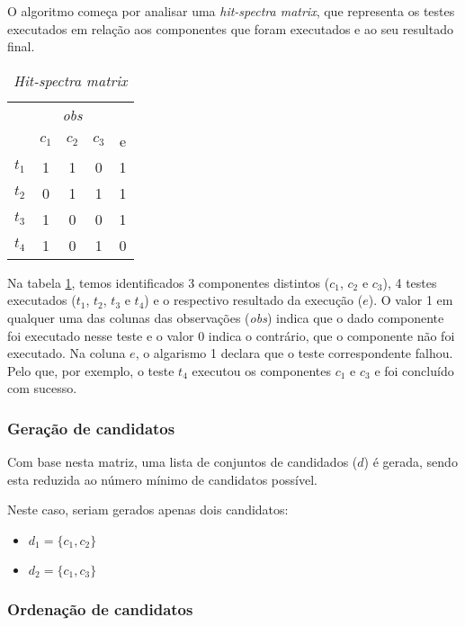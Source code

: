 O algoritmo começa por analisar uma \emph{hit-spectra matrix}, que representa os testes executados em relação aos componentes que foram executados e ao seu resultado final.

\begin{table}[]
	\centering
	\begin{tabular}{c|ccc|c} 
		& \multicolumn{3}{c|}{\textit{obs}} &  \\
		& $c_1$ & $c_2$ & $c_3$ & e \\ 
	 	\hline
		$t_1$ & 1 & 1 & 0 & 1 \\
		$t_2$ & 0 & 1 & 1 & 1 \\
		$t_3$ & 1 & 0 & 0 & 1 \\
		$t_4$ & 1 & 0 & 1 & 0 \\
	\end{tabular}
	\caption{\emph{Hit-spectra matrix}}
	\label{tab:hit-spectra}
\end{table}


Na tabela \ref{tab:hit-spectra}, temos identificados 3 componentes distintos ($c_1$, $c_2$ e $c_3$), 4 testes executados ($t_1$, $t_2$, $t_3$ e $t_4$) e o respectivo resultado da execução ($e$). O valor 1 em qualquer uma das colunas das observações (\emph{obs}) indica que o dado componente foi executado nesse teste e o valor 0 indica o contrário, que o componente não foi executado. Na coluna $e$, o algarismo 1 declara que o teste correspondente falhou. 
Pelo que, por exemplo, o teste $t_4$ executou os componentes $c_1$ e $c_3$ e foi concluído com sucesso.


% 
%

\subsubsection{Geração de candidatos} 

Com base nesta matriz, uma lista de conjuntos de candidados ($d$) é gerada, sendo esta reduzida ao número mínimo de candidatos possível. 

Neste caso, seriam gerados apenas dois candidatos:

\begin{itemize}
\item $d_1 = \{c_1, c_2\}$ 
\item $d_2 = \{c_1, c_3\}$ 
\end{itemize}

% 
%

\subsubsection{Ordenação de candidatos} 

